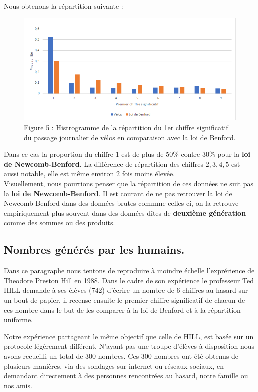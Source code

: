 \documentclass[
  12pt,
]{article}
\begin{document}
Nous obtenons la répartition suivante :

\begin{figure}
\centering
\includegraphics{Images/histogramme_velos.png}
\caption{Figure 5 : Histrogramme de la répartition du 1er chiffre
significatif du passage journalier de vélos en comparaison avec la loi
de Benford.}
\end{figure}

Dans ce cas la proportion du chiffre \(1\) est de plus de \(50 \%\)
contre \(30 \%\) pour la \textbf{loi de Newcomb-Benford}. La différence
de répartition des chiffres \(2, 3, 4, 5\) est aussi notable, elle est
même environ \(2\) fois moins élevée.\\
Visuellement, nous pourrions penser que la répartition de ces données ne
suit pas la \textbf{loi de Newcomb-Benford}. Il est courant de ne pas
retrouver la loi de Newcomb-Benford dans des données brutes commme
celles-ci, on la retrouve empiriquement plus souvent dans des données
dîtes de \textbf{deuxième génération} comme des sommes ou des produits.

\hypertarget{nombres-guxe9nuxe9ruxe9s-par-les-humains.}{%
\subsection{Nombres générés par les
humains.}\label{nombres-guxe9nuxe9ruxe9s-par-les-humains.}}

Dans ce paragraphe nous tentons de reproduire à moindre échelle
l'exprérience de Theodore Preston Hill en 1988. Dans le cadre de son
expérience le professeur Ted HILL demande à ses élèves (742) d'écrire un
nombre de 6 chiffres au hasard sur un bout de papier, il recense ensuite
le premier chiffre significatif de chacun de ces nombre dans le but de
les comparer à la loi de Benford et à la répartition uniforme.

Notre expérience partageant le même objectif que celle de HILL, est
basée sur un protocole légèrement différent. N'ayant pas une troupe
d'élèves à disposition nous avons recueilli un total de 300 nombres. Ces
300 nombres ont été obtenus de plusieurs manières, via des sondages sur
internet ou réseaux sociaux, en demandant directement à des personnes
rencontrées au hasard, notre famille ou nos amis.
\end{document}
